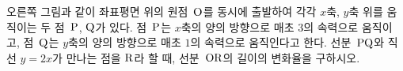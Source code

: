 \noindent\begin{minipage}[t]{0.58\linewidth}\vspace{0pt}\raggedright 오른쪽 그림과 같이 좌표평면 위의 원점~$\mathrm{O}$를 동시에 출발하여 각각 $x$축, $y$축 위를 움직이는 두 점~$\mathrm{P}$, $\mathrm{Q}$가 있다. 점~$\mathrm{P}$는 $x$축의 양의 방향으로 매초 $3$의 속력으로 움직이고, 점~$\mathrm{Q}$는 $y$축의 양의 방향으로 매초 $1$의 속력으로 움직인다고 한다. 선분~$\mathrm{PQ}$와 직선 $y=2x$가 만나는 점을 $\mathrm{R}$라 할 때, 선분~$\mathrm{OR}$의 길이의 변화율을 구하시오.\end{minipage}\hfill\begin{minipage}[t]{0.4\linewidth}\vspace{0pt}\centering \resizebox{\ifdim\width>\linewidth\linewidth\else\width\fi}{!}{}\end{minipage}\par
